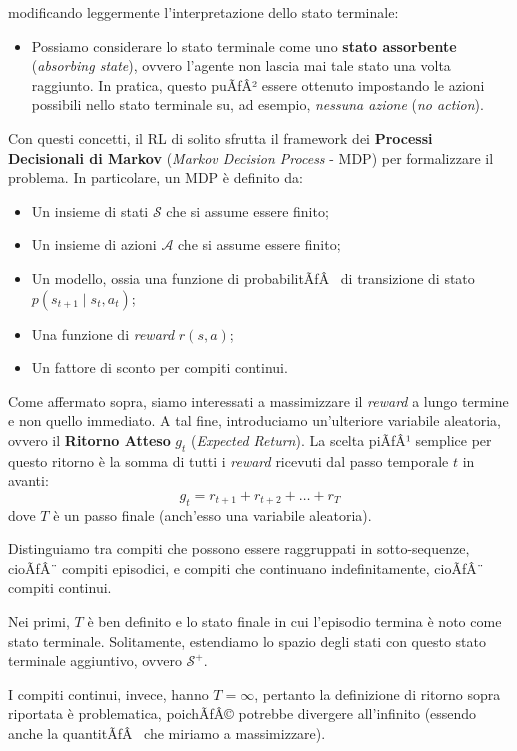 ﻿\documentclass[11pt, a4paper]{report}
\begin{document}
modificando leggermente l'interpretazione dello stato terminale:
\begin{itemize}
    \item Possiamo considerare lo stato terminale come uno \textbf{stato assorbente} (\emph{absorbing state}), ovvero l'agente non lascia mai tale stato una volta raggiunto. In pratica, questo puÃƒÂ² essere ottenuto impostando le azioni possibili nello stato terminale su, ad esempio, \emph{nessuna azione} (\emph{no action}).
\end{itemize}

Con questi concetti, il RL di solito sfrutta il framework dei \textbf{Processi Decisionali di Markov} (\emph{Markov Decision Process} - MDP) per formalizzare il problema. In particolare, un MDP è definito da:
\begin{itemize}
    \item Un insieme di stati $\mathcal{S}$ che si assume essere finito;
    \item Un insieme di azioni $\mathcal{A}$ che si assume essere finito;
    \item Un modello, ossia una funzione di probabilitÃƒÂ  di transizione di stato $p(s_{t+1} \mid s_t, a_t)$;
    \item Una funzione di \emph{reward} $r(s, a)$;
    \item Un fattore di sconto per compiti continui.
\end{itemize}

Come affermato sopra, siamo interessati a massimizzare il \emph{reward} a lungo termine e non quello immediato. A tal fine, introduciamo un'ulteriore variabile aleatoria, ovvero il \textbf{Ritorno Atteso} $g_t$ (\emph{Expected Return}). La scelta piÃƒÂ¹ semplice per questo ritorno è la somma di tutti i \emph{reward} ricevuti dal passo temporale $t$ in avanti:
\begin{equation}
g_t = r_{t+1} + r_{t+2} + \dots + r_T
\end{equation}
dove $T$ è un passo finale (anch'esso una variabile aleatoria).

Distinguiamo tra compiti che possono essere raggruppati in sotto-sequenze, cioÃƒÂ¨ compiti episodici, e compiti che continuano indefinitamente, cioÃƒÂ¨ compiti continui.

Nei primi, $T$ è ben definito e lo stato finale in cui l'episodio termina è noto come stato terminale. Solitamente, estendiamo lo spazio degli stati con questo stato terminale aggiuntivo, ovvero $\mathcal{S}^+$.

I compiti continui, invece, hanno $T = \infty$, pertanto la definizione di ritorno sopra riportata è problematica, poichÃƒÂ© potrebbe divergere all'infinito (essendo anche la quantitÃƒÂ  che miriamo a massimizzare).
\end{document}

